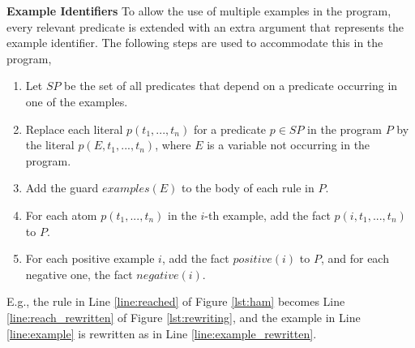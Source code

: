 \vspace{3pt}
\textbf{Example Identifiers} 
To allow the use of multiple examples in the program, every relevant predicate is extended with
an extra argument that represents the example identifier.  The following steps are used
to accommodate this in the program,
\begin{enumerate}
\item
  Let $\textit{SP}$ be the set of all predicates that depend on a predicate occurring in one of the examples. 
\item
  Replace each literal $p(t_1, ...,t_n)$ for a predicate $p \in \textit{SP}$ in the program $P$ by 
the literal $p(E,t_1, ...,t_n)$, where $E$ is a variable not occurring in the program. 
\item
  Add the guard $\textit{examples}(E)$ to the body of each rule in $P$.\
\item
For each atom $p(t_1,...,t_n)$ in the $i$-th example, add the fact $p(i,t_1,...,t_n)$ to $P$.
\item
  For each positive example $i$, add the fact $\textit{positive}(i)$ to $P$, and for each negative one, the fact $\textit{negative}(i)$.
\end{enumerate}
E.g., the rule in Line \ref{line:reached} of Figure \ref{lst:ham} becomes Line \ref{line:reach_rewritten} of Figure \ref{lst:rewriting}, and the example in Line \ref{line:example} is rewritten as in Line \ref{line:example_rewritten}.



